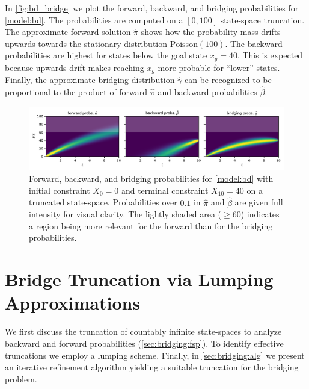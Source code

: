 \begin{example}
In \autoref{fig:bd_bridge} we plot the forward, backward, and bridging probabilities for \autoref{model:bd}.
The probabilities are computed on a $[0,100]$ state-space truncation.
The approximate forward solution $\hat\pi$ shows how the probability mass drifts upwards towards the stationary distribution $\text{Poisson}(100)$. The backward probabilities are highest for states below the goal state $x_g=40$.
This is expected because upwards drift makes reaching $x_g$ more probable for ``lower'' states.
Finally, the approximate bridging distribution $\hat\gamma$ can be recognized to be proportional to the product of forward $\hat\pi$ and backward probabilities $\hat\beta$.
\begin{figure}[htb]
    \centering
    \includegraphics[width=\textwidth]{gfx/bridging_bd.pdf}
	\caption[Forward, backward, and bridging probabilities for \autoref{model:bd}]{Forward, backward, and bridging probabilities for \autoref{model:bd} with initial constraint $X_0=0$ and terminal constraint $X_{10}=40$ on a truncated state-space. Probabilities over $0.1$ in $\hat\pi$ and $\hat\beta$ are given full intensity for visual clarity. %
    The lightly shaded area ($\geq 60$) indicates a region being more relevant for the forward than for the bridging probabilities.}
    \label{fig:bd_bridge}
\end{figure}
\end{example}

\section{Bridge Truncation via Lumping Approximations}\label{sec:bridging:method}
We first discuss the truncation of countably infinite state-spaces
to analyze backward and forward probabilities (\autoref{sec:bridging:fsp}).
To identify effective truncations we employ a lumping scheme.
Finally, in \autoref{sec:bridging:alg} we present an iterative refinement algorithm
yielding a suitable truncation for the bridging problem.

